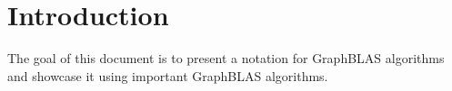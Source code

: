 \section{Introduction}
\label{sec:introduction}

The goal of this document is to present a notation for GraphBLAS algorithms and showcase it using important GraphBLAS algorithms.



